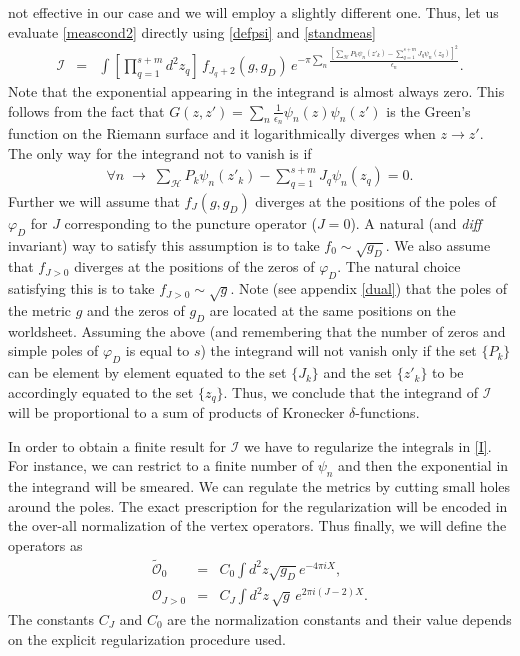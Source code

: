 \documentclass[11pt]{JHEP3}
\def\be{\begin{eqnarray}}
\def\ee{\end{eqnarray}}
\def\e{\epsilon}
\def\vf{\varphi}
\def\e{\epsilon}
\begin{document}
not effective in our case and we will employ a slightly different one.
Thus, let us evaluate \eqref{meascond2} directly
using \eqref{defpsi} and \eqref{standmeas}
\be\label{I}
{\mathcal I}
&=&\int \left[\prod_{q=1}^{s+m}d^2z_q\right]\,f_{J_q+2}(g,g_D)\,e^{-\pi\sum_n\frac{\left[\sum_{\mathcal H}P_k\psi_n(z'_k)-\sum_{q=1}^{s+m} J_q\psi_n(z_q)\right]^2}{\e_n}}.
\ee 
Note that the exponential appearing in the integrand is almost always zero. This follows from the fact that $G(z,z')=\sum_n\frac{1}{\e_n}\psi_n(z)\psi_n(z')$ is the Green's function on the Riemann surface and it logarithmically diverges when $z\to z'$.
The only way for the integrand not to vanish is if 
\be\label{cond3}\forall n\; \to\;\sum_{\mathcal H}P_k\psi_n(z'_k)-\sum_{q=1}^{s+m} J_q\psi_n(z_q)=0.\ee
Further we will assume that $f_{J}(g,g_D)$ diverges at the positions of the poles of $\vf_D$ for $J$ corresponding to the puncture operator ($J=0$). A natural (and \textit{diff} invariant)
way to satisfy this assumption is to take $f_{0}\sim\sqrt{g_D}$.
 We also assume
that  $f_{J>0}$ diverges  at the positions of the zeros of $\vf_D$. The natural choice satisfying this is to take 
$f_{J>0}\sim \sqrt{g}$. Note  (see appendix \ref{dual}) that the poles of the metric $g$ and the zeros of $g_D$ are
located at the same positions on the worldsheet.
Assuming the above (and remembering that the number of zeros and simple poles
of $\vf_D$ is equal to $s$) the integrand will not vanish  only  if the set $\{P_k\}$ can be element by element equated to the set $\{J_k\}$ and the set
 $\{z'_k\}$ to be accordingly equated to the set $\{z_q\}$. Thus, we conclude that the integrand
of  ${\mathcal I}$ will be proportional to a sum of products
 of Kronecker $\delta$-functions.

In order to obtain a finite result for ${\mathcal I}$ we have to regularize the integrals in \eqref{I}.
 For instance, we can restrict to a finite number of $\psi_n$ and then the exponential in the integrand will be smeared.
  We can regulate the metrics by cutting small holes around the poles. The exact prescription for the regularization will be encoded in the over-all normalization of the vertex operators.
 Thus finally, we will define the  operators as
\be
\tilde {\mathcal O}_0&=&C_0 \int d^2z\sqrt{g_D}e^{-4\pi i X},\\
{\mathcal O}_{J>0}&=& C_J \int d^2z\,\sqrt{g}\,e^{2\pi i(J-2) X}.\nonumber
\ee 
The constants $C_J$ and $C_0$ are the normalization constants and their value depends on the explicit regularization procedure
used.
\end{document}
